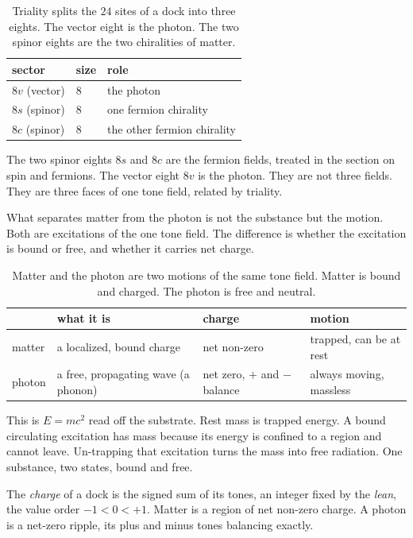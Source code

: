 \begin{table}[ht]
\centering
\begin{tabular}{@{}lll@{}}
\toprule
sector & size & role \\
\midrule
$8v$ (vector) & $8$ & the photon \\
$8s$ (spinor) & $8$ & one fermion chirality \\
$8c$ (spinor) & $8$ & the other fermion chirality \\
\bottomrule
\end{tabular}
\caption{Triality splits the $24$ sites of a dock into three eights. The vector eight is the photon. The two spinor eights are the two chiralities of matter.}
\label{tab:triality-sectors}
\end{table}

The two spinor eights $8s$ and $8c$ are the fermion fields, treated in the section on spin and fermions. The vector eight $8v$ is the photon. They are not three fields. They are three faces of one tone field, related by triality.

What separates matter from the photon is not the substance but the motion. Both are excitations of the one tone field. The difference is whether the excitation is bound or free, and whether it carries net charge.

\begin{table}[ht]
\centering
\begin{tabular}{@{}llll@{}}
\toprule
 & what it is & charge & motion \\
\midrule
matter & a localized, bound charge & net non-zero & trapped, can be at rest \\
photon & a free, propagating wave (a phonon) & net zero, $+$ and $-$ balance & always moving, massless \\
\bottomrule
\end{tabular}
\caption{Matter and the photon are two motions of the same tone field. Matter is bound and charged. The photon is free and neutral.}
\label{tab:matter-vs-photon}
\end{table}

This is $E = mc^2$ read off the substrate. Rest mass is trapped energy. A bound circulating excitation has mass because its energy is confined to a region and cannot leave. Un-trapping that excitation turns the mass into free radiation. One substance, two states, bound and free.

\begin{definition}
The \emph{charge} of a dock is the signed sum of its tones, an integer fixed by the \emph{lean}, the value order $-1 < 0 < +1$. Matter is a region of net non-zero charge. A photon is a net-zero ripple, its plus and minus tones balancing exactly.
\end{definition}

